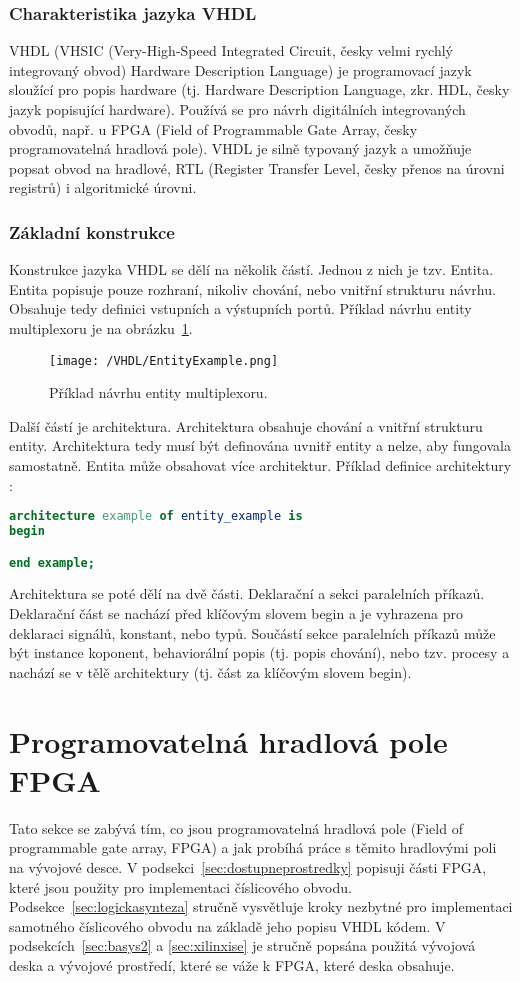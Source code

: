 \documentclass{report}
\begin{document}
\subsubsection{Charakteristika jazyka VHDL}
VHDL (VHSIC (Very-High-Speed Integrated Circuit, česky velmi rychlý integrovaný obvod) Hardware Description Language) je programovací jazyk sloužící pro popis hardware (tj. Hardware Description Language, zkr. HDL, česky jazyk popisující hardware). Používá se pro návrh digitálních integrovaných obvodů, např. u FPGA (Field of Programmable Gate Array, česky programovatelná hradlová pole). VHDL je silně typovaný jazyk a umožňuje popsat obvod na hradlové, RTL (Register Transfer Level, česky přenos na úrovni registrů) i algoritmické úrovni.
\subsubsection{Základní konstrukce}
Konstrukce jazyka VHDL se dělí na několik částí. Jednou z nich je tzv. Entita. Entita popisuje pouze rozhraní, nikoliv chování, nebo vnitřní strukturu návrhu. Obsahuje tedy definici vstupních a výstupních portů. Příklad návrhu entity multiplexoru je na obrázku~\ref{fig:entityexample}.
\begin{figure}
\centering
\texttt{[image: /VHDL/EntityExample.png]}
\caption{Příklad návrhu entity multiplexoru.}
\label{fig:entityexample}
\end{figure}
Další částí je architektura. Architektura obsahuje chování a vnitřní strukturu entity. Architektura tedy musí být definována uvnitř entity a nelze, aby fungovala samostatně. Entita může obsahovat více architektur. Příklad definice architektury :
\begin{lstlisting}[language=VHDL]
architecture example of entity_example is
begin

end example;
\end{lstlisting}
Architektura se poté dělí na dvě části. Deklarační a sekci paralelních příkazů. Deklarační část se nachází před klíčovým slovem begin a je vyhrazena pro deklaraci signálů, konstant, nebo typů. Součástí sekce paralelních příkazů může být instance koponent, behaviorální popis (tj. popis chování), nebo tzv. procesy a nachází se v tělě architektury (tj. část za klíčovým slovem begin).  

\section{Programovatelná hradlová pole FPGA}\label{sec:fpga}
Tato sekce se zabývá tím, co jsou programovatelná hradlová pole (Field of programmable gate array, FPGA) a jak probíhá práce s těmito hradlovými poli na vývojové desce. V podsekci~\ref{sec:dostupneprostredky} popisuji části FPGA, které jsou použity pro implementaci číslicového obvodu. Podsekce~\ref{sec:logickasynteza} stručně vysvětluje kroky nezbytné pro implementaci samotného číslicového obvodu na základě jeho popisu VHDL kódem. V podsekcích~\ref{sec:basys2} a \ref{sec:xilinxise} je stručně popsána použitá vývojová deska a vývojové prostředí, které se váže k FPGA, které deska obsahuje.
\end{document}
